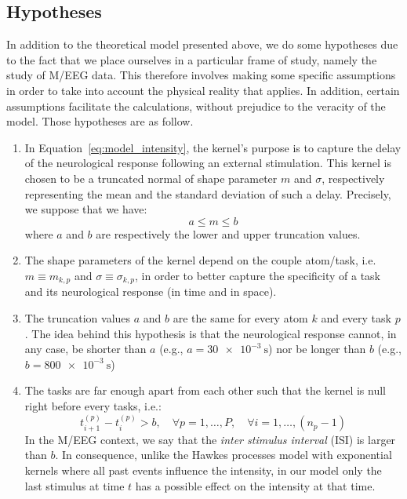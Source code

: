 \subsection{Hypotheses}\label{hypotheses}

In addition to the theoretical model presented above, we do some hypotheses due to the fact that we place ourselves in a particular frame of study, namely the study of M/EEG data.
This therefore involves making some specific assumptions in order to take into account the physical reality that applies.
In addition, certain assumptions facilitate the calculations, without prejudice to the veracity of the model.
Those hypotheses are as follow.


\begin{enumerate}
    \item In Equation~\eqref{eq:model_intensity}, the kernel's purpose is to capture the delay of the neurological response following an external stimulation.
    This kernel is chosen to be a truncated normal of shape parameter $m$ and $\sigma$, respectively representing the mean and the standard deviation of such a delay.
    Precisely, we suppose that we have:
    \begin{equation}\label{eq:m_in_between}
        a \leq m \leq b
    \end{equation}
    where $a$ and $b$ are respectively the lower and upper truncation values.
    
    \item The shape parameters of the kernel depend on the couple atom/task, i.e. $m\equiv m_{k,p}$ and $\sigma \equiv \sigma_{k,p}$, in order to better capture the specificity of a task and its neurological response (in time and in space).
    
    \item The truncation values $a$ and $b$ are the same for every atom $k$ and every task $p$.
    The idea behind this hypothesis is that the neurological response cannot, in any case, be shorter than $a$ (e.g., $a = \SI{30e-3}{\second}$) nor be longer than $b$ (e.g., $b = \SI{800e-3}{\second}$)
    
    \item The tasks are far enough apart from each other such that the kernel is null right before every tasks, i.e.:
    \begin{equation}\label{eq:separated_timestamps}
        t_{i+1}^{(p)} - t_i^{(p)} > b, \quad \forall p=1,\dots,P, \quad \forall i=1,\dots, (n_p-1)
    \end{equation}
    In the M/EEG context, we say that the \textit{inter stimulus interval} (ISI) is larger than $b$.
    In consequence, unlike the Hawkes processes model with exponential kernels where all past events influence the intensity, in our model only the last stimulus at time $t$ has a possible effect on the intensity at that time.
    

\end{enumerate}
